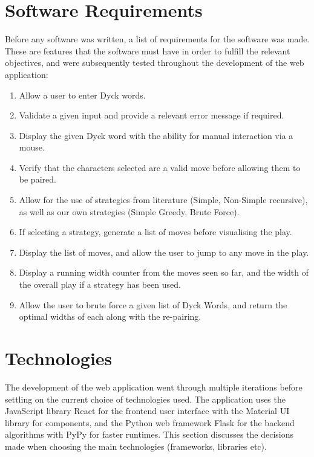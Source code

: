 \section{Software Requirements}
Before any software was written, a list of requirements for the software was made. These are features that the software must have in order to fulfill the relevant objectives, and were subsequently tested throughout the development of the web application:
\begin{enumerate}
    \item Allow a user to enter Dyck words.
    \item Validate a given input and provide a relevant error message if required.
    \item Display the given Dyck word with the ability for manual interaction via a mouse.
    \item Verify that the characters selected are a valid move before allowing them to be paired.
    \item Allow for the use of strategies from literature (Simple, Non-Simple recursive), as well as our own strategies (Simple Greedy, Brute Force).
    \item If selecting a strategy, generate a list of moves before visualising the play.
    \item Display the list of moves, and allow the user to jump to any move in the play.
    \item Display a running width counter from the moves seen so far, and the width of the overall play if a strategy has been used.
    \item Allow the user to brute force a given list of Dyck Words, and return the optimal widths of each along with the re-pairing.
\end{enumerate}

\section{Technologies}
The development of the web application went through multiple iterations before settling on the current choice of technologies used. The application uses the JavaScript library React for the frontend user interface with the Material UI library for components, and the Python web framework Flask for the backend algorithms with PyPy for faster runtimes. This section discusses the decisions made when choosing the main technologies (frameworks, libraries etc).

